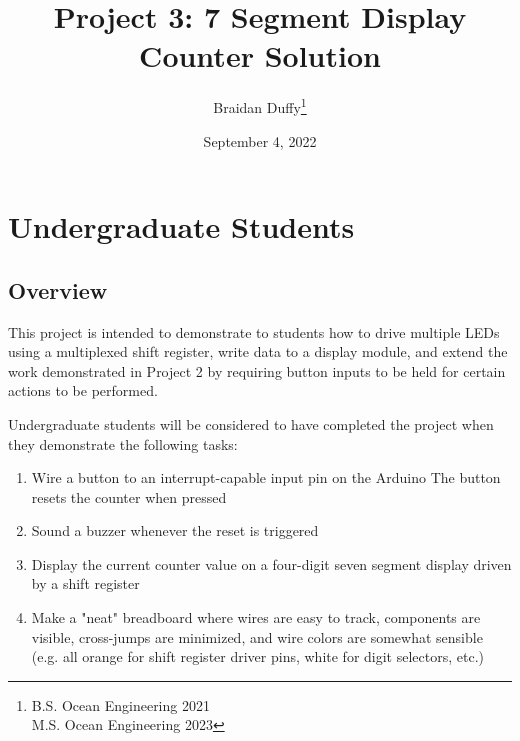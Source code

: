 \documentclass{article}
\title{Project 3: 7 Segment Display Counter Solution}
\author{Braidan Duffy\thanks{B.S. Ocean Engineering 2021\\M.S. Ocean Engineering 2023}}
\date{September 4, 2022}
\begin{document}
\maketitle

\section*{Undergraduate Students}
    \subsection*{Overview}
    This project is intended to demonstrate to students how to drive multiple LEDs using a multiplexed shift register, write data to a display module, and extend the work demonstrated in Project 2 by requiring button inputs to be held for certain actions to be performed.

    Undergraduate students will be considered to have completed the project when they demonstrate the following tasks:

    \begin{enumerate}
        \item Wire a button to an interrupt-capable input pin on the Arduino
            \subitem The button resets the counter when pressed
        \item Sound a buzzer whenever the reset is triggered
        \item Display the current counter value on a four-digit seven segment display driven by a shift register
        \item Make a "neat" breadboard where wires are easy to track, components are visible, cross-jumps are minimized, and wire colors are somewhat sensible (e.g. all orange for shift register driver pins, white for digit selectors, etc.)
    \end{enumerate}
\end{document}
